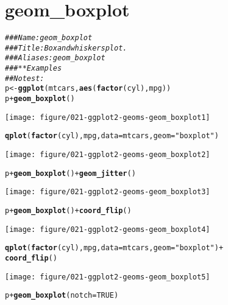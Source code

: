 \documentclass[a4paper,titlepage]{tufte-handout}\usepackage[]{graphicx}\usepackage[]{color}
\makeatletter
\def\maxwidth{ %
  \ifdim\Gin@nat@width>\linewidth
    \linewidth
  \else
    \Gin@nat@width
  \fi
}
\newcommand{\hlnum}[1]{\textcolor[rgb]{0.686,0.059,0.569}{#1}}%
\newcommand{\hlstr}[1]{\textcolor[rgb]{0.192,0.494,0.8}{#1}}%
\newcommand{\hlcom}[1]{\textcolor[rgb]{0.678,0.584,0.686}{\textit{#1}}}%
\newcommand{\hlopt}[1]{\textcolor[rgb]{0,0,0}{#1}}%
\newcommand{\hlstd}[1]{\textcolor[rgb]{0.345,0.345,0.345}{#1}}%
\newcommand{\hlkwb}[1]{\textcolor[rgb]{0.69,0.353,0.396}{#1}}%
\newcommand{\hlkwc}[1]{\textcolor[rgb]{0.333,0.667,0.333}{#1}}%
\newcommand{\hlkwd}[1]{\textcolor[rgb]{0.737,0.353,0.396}{\textbf{#1}}}%
\newenvironment{kframe}{%
 \def\at@end@of@kframe{}%
 \ifinner\ifhmode%
  \def\at@end@of@kframe{\end{minipage}}%
  \begin{minipage}{\columnwidth}%
 \fi\fi%
 \def\FrameCommand##1{\hskip\@totalleftmargin \hskip-\fboxsep
 \colorbox{shadecolor}{##1}\hskip-\fboxsep
     \hskip-\linewidth \hskip-\@totalleftmargin \hskip\columnwidth}%
 \MakeFramed {\advance\hsize-\width
   \@totalleftmargin\z@ \linewidth\hsize
   \@setminipage}}%
 {\par\unskip\endMakeFramed%
 \at@end@of@kframe}
\newenvironment{knitrout}{}{} %
\makeatother
\begin{document}
\section{geom\_boxplot}

\begin{knitrout}
\color{fgcolor}\begin{kframe}
\begin{alltt}
\hlcom{### Name: geom_boxplot}
\hlcom{### Title: Box and whiskers plot.}
\hlcom{### Aliases: geom_boxplot}
\hlcom{### ** Examples}
\hlcom{## No test: }
\hlstd{p} \hlkwb{<-} \hlkwd{ggplot}\hlstd{(mtcars,} \hlkwd{aes}\hlstd{(}\hlkwd{factor}\hlstd{(cyl), mpg))}
\hlstd{p} \hlopt{+} \hlkwd{geom_boxplot}\hlstd{()}
\end{alltt}
\end{kframe}
\texttt{[image: figure/021-ggplot2-geoms-geom\_boxplot1]} 
\begin{kframe}\begin{alltt}
\hlkwd{qplot}\hlstd{(}\hlkwd{factor}\hlstd{(cyl), mpg,} \hlkwc{data} \hlstd{= mtcars,} \hlkwc{geom} \hlstd{=} \hlstr{"boxplot"}\hlstd{)}
\end{alltt}
\end{kframe}
\texttt{[image: figure/021-ggplot2-geoms-geom\_boxplot2]} 
\begin{kframe}\begin{alltt}
\hlstd{p} \hlopt{+} \hlkwd{geom_boxplot}\hlstd{()} \hlopt{+} \hlkwd{geom_jitter}\hlstd{()}
\end{alltt}
\end{kframe}
\texttt{[image: figure/021-ggplot2-geoms-geom\_boxplot3]} 
\begin{kframe}\begin{alltt}
\hlstd{p} \hlopt{+} \hlkwd{geom_boxplot}\hlstd{()} \hlopt{+} \hlkwd{coord_flip}\hlstd{()}
\end{alltt}
\end{kframe}
\texttt{[image: figure/021-ggplot2-geoms-geom\_boxplot4]} 
\begin{kframe}\begin{alltt}
\hlkwd{qplot}\hlstd{(}\hlkwd{factor}\hlstd{(cyl), mpg,} \hlkwc{data} \hlstd{= mtcars,} \hlkwc{geom} \hlstd{=} \hlstr{"boxplot"}\hlstd{)} \hlopt{+}
  \hlkwd{coord_flip}\hlstd{()}
\end{alltt}
\end{kframe}
\texttt{[image: figure/021-ggplot2-geoms-geom\_boxplot5]} 
\begin{kframe}\begin{alltt}
\hlstd{p} \hlopt{+} \hlkwd{geom_boxplot}\hlstd{(}\hlkwc{notch} \hlstd{=} \hlnum{TRUE}\hlstd{)}
\end{alltt}



\end{kframe}
\end{knitrout}
\end{document}

